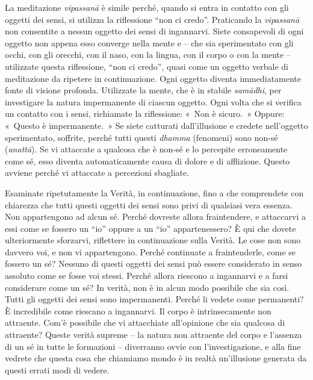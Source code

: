 La meditazione \emph{vipassanā} è simile perché, quando si entra in
contatto con gli oggetti dei sensi, si utilizza la riflessione ``non ci
credo''. Praticando la \emph{vipassanā} non consentite a nessun oggetto
dei sensi di ingannarvi. Siete consapevoli di ogni oggetto non appena
esso converge nella mente e -- che sia sperimentato con gli occhi, con
gli orecchi, con il naso, con la lingua, con il corpo o con la mente --
utilizzate questa riflessione, ``non ci credo'', quasi come un oggetto
verbale di meditazione da ripetere in continuazione. Ogni oggetto
diventa immediatamente fonte di visione profonda. Utilizzate la mente,
che è in stabile \emph{samādhi}, per investigare la natura impermanente
di ciascun oggetto. Ogni volta che si verifica un contatto con i sensi,
richiamate la riflessione: «~Non è sicuro.~» Oppure: «~Questo è
impermanente.~» Se siete catturati dall'illusione e credete nell'oggetto
sperimentato, soffrite, perché tutti questi \emph{dhamma} (fenomeni)
sono non-sé (\emph{anattā}). Se vi attaccate a qualcosa che è non-sé e
lo percepite erroneamente come sé, esso diventa automaticamente causa di
dolore e di afflizione. Questo avviene perché vi attaccate a percezioni
sbagliate.

Esaminate ripetutamente la Verità, in continuazione, fino a che
comprendete con chiarezza che tutti questi oggetti dei sensi sono privi
di qualsiasi vera essenza. Non appartengono ad alcun sé. Perché dovreste
allora fraintendere, e attaccarvi a essi come se fossero un ``io''
oppure a un ``io'' appartenessero? È qui che dovete ulteriormente
sforzarvi, riflettere in continuazione sulla Verità. Le cose non sono
davvero voi, e non vi appartengono. Perché continuate a fraintenderle,
come se fossero un sé? Nessuno di questi oggetti dei sensi può essere
considerato in senso assoluto come se fosse voi stessi. Perché allora
riescono a ingannarvi e a farsi considerare come un sé? In verità, non è
in alcun modo possibile che sia così. Tutti gli oggetti dei sensi sono
impermanenti. Perché li vedete come permanenti? È incredibile come
riescano a ingannarvi. Il corpo è intrinsecamente non attraente. Com'è
possibile che vi attacchiate all'opinione che sia qualcosa di attraente?
Queste verità supreme -- la natura non attraente del corpo e l'assenza
di un sé in tutte le formazioni -- diverranno ovvie con
l'investigazione, e alla fine vedrete che questa cosa che chiamiamo
mondo è in realtà un'illusione generata da questi errati modi di vedere.

